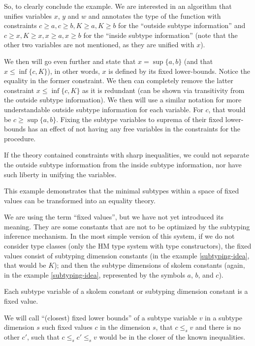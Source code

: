 \begin{ex}
So, to clearly conclude the example. We are interested in an algorithm that unifies variables $x$, $y$ and $w$ and annotates the type of the function with constraints $c \geq a, c \geq b, K \geq a, K \geq b$ for the ``outside subtype information'' and $c \geq x, K \geq x, x \geq a, x \geq b$ for the ``inside subtype information'' (note that the other two variables are not mentioned, as they are unified with $x$).

We then will go even further and state that $x = \sup \{a, b\}$ (and that $x \leq \inf \{c, K\}$), in other words, $x$ is defined by its fixed lower-bounds. Notice the equality in the former constraint. We then can completely remove the latter constraint $x \leq \inf \{c, K\}$ as it is redundant (can be shown via transitivity from the outside subtype information).  We then will use a similar notation for more understandable outside subtype information for each variable. For $c$, that would be $c \geq \sup \{a, b\}$. Fixing the subtype variables to suprema of their fixed lower-bounds has an effect of not having any free variables in the constraints for the procedure.

If the theory contained constraints with sharp inequalities, we could not separate the outside subtype information from the inside subtype information, nor have such liberty in unifying the variables.

This example demonstrates that the minimal subtypes within a space of fixed values can be transformed into an equality theory.

\end{ex}

We are using the term ``fixed values'', but we have not yet introduced its meaning. They are some constants that are not to be optimized by the subtyping inference mechanism. In the most simple version of this system, if we do not consider type classes (only the HM type system with type constructors), the fixed values consist of subtyping dimension constants (in the example \ref{subtyping-idea}, that would be $K$); and then the subtype dimensions of skolem constants (again, in the example \ref{subtyping-idea}, represented by the symbols $a$, $b$, and $c$).

\begin{defn}
    Each subtype variable of a skolem constant or subtyping dimension constant is a fixed value.
\end{defn}

\begin{defn}
    We will call ``(closest) fixed lower bounds'' of a subtype variable $v$ in a subtype dimension $s$ such fixed values $c$ in the dimension $s$, that $c \leq_s v$ and there is no other $c'$, such that $c \leq_s c' \leq_s v$ would be in the closer of the known inequalities.
\end{defn}

